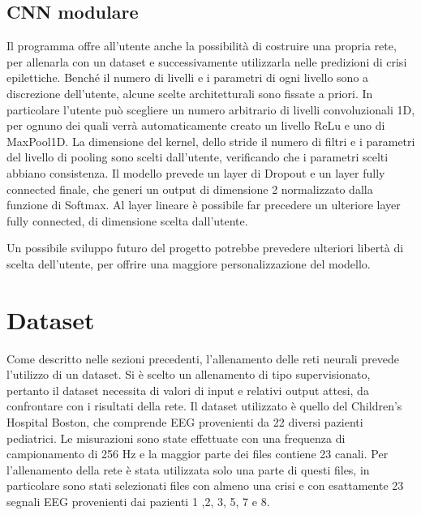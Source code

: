 \documentclass{article}
\begin{document}
\subsection{CNN modulare}
Il programma offre all'utente anche la possibilità di costruire una propria rete, per allenarla con un dataset e successivamente utilizzarla nelle predizioni di crisi epilettiche. Benché il numero di livelli e i parametri di ogni livello sono a discrezione dell'utente, alcune scelte architetturali sono fissate a priori. In particolare l'utente può scegliere un numero arbitrario di livelli convoluzionali 1D, per ognuno dei quali verrà automaticamente creato un livello ReLu e uno di MaxPool1D. La dimensione del kernel, dello stride il numero di filtri e i parametri del livello di pooling sono scelti dall'utente, verificando che i parametri scelti abbiano consistenza.
Il modello prevede un layer di Dropout e un layer fully connected finale, che generi un output di dimensione 2 normalizzato dalla funzione di Softmax. Al layer lineare è possibile far precedere un ulteriore layer fully connected, di dimensione scelta dall'utente. 

Un possibile sviluppo futuro del progetto potrebbe prevedere ulteriori libertà di scelta dell'utente, per offrire una maggiore personalizzazione del modello. 


\section{Dataset}
Come descritto nelle sezioni precedenti, l'allenamento delle reti neurali prevede l'utilizzo di un dataset. Si è scelto un allenamento di tipo supervisionato, pertanto il dataset necessita di valori di input e relativi output attesi, da confrontare con i risultati della rete. Il dataset utilizzato è quello del Children's Hospital Boston, che comprende EEG provenienti da 22 diversi pazienti pediatrici. Le misurazioni sono state effettuate con una frequenza di campionamento di 256 Hz e la maggior parte dei files contiene 23 canali. Per l'allenamento della rete è stata utilizzata solo una parte di questi files, in particolare sono stati selezionati files con almeno una crisi e con esattamente 23 segnali EEG provenienti dai pazienti 1 ,2, 3, 5, 7 e 8.
\end{document}
